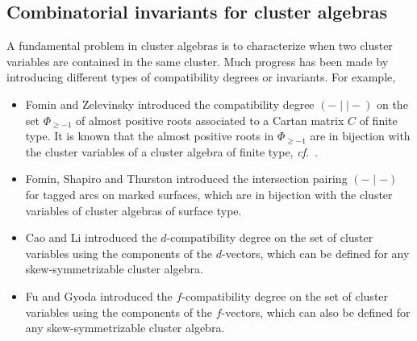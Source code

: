 \documentclass[12pt]{amsart}
\theoremstyle{definition}
\theoremstyle{remark}
\numberwithin{equation}{section}
\newcommand{\confer}{\textit{cf.}\ }
\begin{document}
 \subsection{Combinatorial invariants for cluster algebras}
A fundamental problem in cluster algebras is to characterize when two cluster variables are contained in the same cluster. Much progress has been made by introducing different types of compatibility degrees or invariants. For example,
\begin{itemize}
\item Fomin and Zelevinsky \cite{fz-2003y} introduced the compatibility degree $(-\mid\mid-)$ on the set $\Phi_{\geq -1}$ of almost positive roots associated to a Cartan matrix $C$ of finite type. It is known that the almost positive roots in  $\Phi_{\geq -1}$ are in bijection with the cluster variables of a cluster algebra of finite type, \confer \cite{fz_2003f}. 
\item Fomin, Shapiro and Thurston \cite{FST08} introduced the intersection pairing $(-\mid-)$  for tagged arcs on marked surfaces, which are in bijection with the cluster variables of cluster algebras of surface type.
\item Cao and Li \cite{cao-li-2020} introduced the $d$-compatibility degree
on the set of cluster variables using the components of the $d$-vectors, which can be defined for any skew-symmetrizable cluster algebra. 
\item Fu and Gyoda \cite{Fu-Gyoda} introduced the $f$-compatibility degree
on the set of cluster variables using the components of the $f$-vectors, which can also be defined for any skew-symmetrizable cluster algebra. 
\end{itemize}
\end{document}
